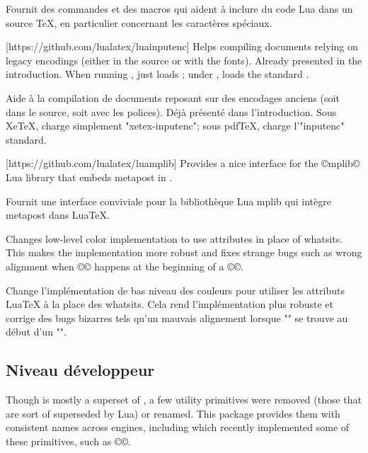 \documentclass{lltxdoc}
\begin{document}
Fournit des commandes et des macros qui aident à inclure du code Lua dans un source TeX, en particulier concernant les caractères spéciaux.

[https://github.com/lualatex/luainputenc]
Helps compiling documents relying on legacy encodings (either in the source or
with the fonts). Already presented in the introduction. When running \xetex,
just loads ; under \pdftex, loads the standard
.

Aide à la compilation de documents reposant sur des encodages anciens (soit dans le source, soit avec les polices). Déjà présenté dans l'introduction. Sous XeTeX, charge simplement "xetex-inputenc"; sous pdfTeX, charge l'"inputenc" standard.

[https://github.com/lualatex/luamplib]
Provides a nice interface for the ©mplib© Lua library that embeds metapost in
\luatex.

Fournit une interface conviviale pour la bibliothèque Lua mplib qui intègre metapost dans LuaTeX.

Changes low-level color implementation to use \luatex attributes in place of
whatsits. This makes the implementation more robust and fixes strange bugs
such as wrong alignment when ©\color© happens at the beginning of a ©\vbox©.

Change l'implémentation de bas niveau des couleurs pour utiliser les attributs LuaTeX à la place des whatsits. Cela rend l'implémentation plus robuste et corrige des bugs bizarres tels qu'un mauvais alignement lorsque "\color" se trouve au début d'un "\vbox".

\subsection{Niveau développeur}

Though \luatex is mostly a superset of \pdftex, a few utility primitives were
removed (those that are sort of superseded by Lua) or renamed. This package
provides them with consistent names across engines, including \xetex which
recently implemented some of these primitives, such as ©\strcmp©.
\end{document}
